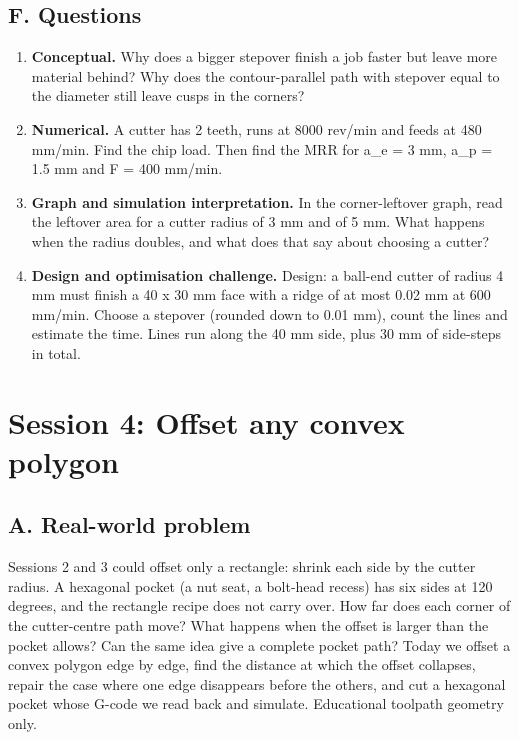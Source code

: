\documentclass[11pt,a4paper]{article}
\begin{document}
\subsection*{F. Questions}
\begin{enumerate}[nosep]
\item \textbf{Conceptual.} Why does a bigger stepover finish a job faster but leave more material behind? Why does the contour-parallel path with stepover equal to the diameter still leave cusps in the corners?
\item \textbf{Numerical.} A cutter has 2 teeth, runs at 8000 rev/min and feeds at 480 mm/min. Find the chip load. Then find the MRR for a\_e = 3 mm, a\_p = 1.5 mm and F = 400 mm/min.
\item \textbf{Graph and simulation interpretation.} In the corner-leftover graph, read the leftover area for a cutter radius of 3 mm and of 5 mm. What happens when the radius doubles, and what does that say about choosing a cutter?
\item \textbf{Design and optimisation challenge.} Design: a ball-end cutter of radius 4 mm must finish a 40 x 30 mm face with a ridge of at most 0.02 mm at 600 mm/min. Choose a stepover (rounded down to 0.01 mm), count the lines and estimate the time. Lines run along the 40 mm side, plus 30 mm of side-steps in total.
\end{enumerate}

\section{Session 4: Offset any convex polygon}

\subsection*{A. Real-world problem}
Sessions 2 and 3 could offset only a rectangle: shrink each side by the cutter radius. A hexagonal pocket (a nut seat, a bolt-head recess) has six sides at 120 degrees, and the rectangle recipe does not carry over. How far does each corner of the cutter-centre path move? What happens when the offset is larger than the pocket allows? Can the same idea give a complete pocket path? Today we offset a convex polygon edge by edge, find the distance at which the offset collapses, repair the case where one edge disappears before the others, and cut a hexagonal pocket whose G-code we read back and simulate. Educational toolpath geometry only.
\end{document}
